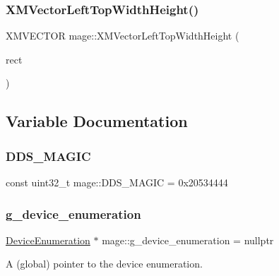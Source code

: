 \hypertarget{namespacemage_abda051097e5b76fb65983141822cb170}{}\label{namespacemage_abda051097e5b76fb65983141822cb170} 
\subsubsection{\texorpdfstring{X\+M\+Vector\+Left\+Top\+Width\+Height()}{XMVectorLeftTopWidthHeight()}}
{\footnotesize\ttfamily X\+M\+V\+E\+C\+T\+OR mage\+::\+X\+M\+Vector\+Left\+Top\+Width\+Height (\begin{DoxyParamCaption}\item[{const R\+E\+CT \&}]{rect }\end{DoxyParamCaption})}



\subsection{Variable Documentation}
\hypertarget{namespacemage_a52f784e41b51fee843891c6b5e9be479}{}\label{namespacemage_a52f784e41b51fee843891c6b5e9be479} 
\subsubsection{\texorpdfstring{D\+D\+S\+\_\+\+M\+A\+G\+IC}{DDS\_MAGIC}}
{\footnotesize\ttfamily const uint32\+\_\+t mage\+::\+D\+D\+S\+\_\+\+M\+A\+G\+IC = 0x20534444}

\hypertarget{namespacemage_a73e54b9b368875ed0281ced59e2fca7e}{}\label{namespacemage_a73e54b9b368875ed0281ced59e2fca7e} 
\subsubsection{\texorpdfstring{g\+\_\+device\+\_\+enumeration}{g\_device\_enumeration}}
{\footnotesize\ttfamily \hyperlink{classmage_1_1_device_enumeration}{Device\+Enumeration} $\ast$ mage\+::g\+\_\+device\+\_\+enumeration = nullptr}

A (global) pointer to the device enumeration. \hypertarget{namespacemage_a84bf83f1e8779d884452cdf08f56c19a}{}\label{namespacemage_a84bf83f1e8779d884452cdf08f56c19a} 
